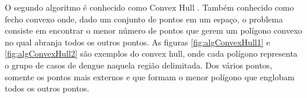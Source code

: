 O segundo algoritmo é conhecido como Convex Hull \cite{ConvexHull}. Também conhecido como fecho convexo onde, dado um conjunto de pontos em um espaço,
o problema consiste em encontrar o menor número de pontos que gerem um polígono convexo no qual abranja todos os outros pontos.
As figuras \ref{fig:algConvexHull1} e \ref{fig:algConvexHull2} são exemplos do convex hull, onde cada polígono representa o grupo de casos de dengue naquela região delimitada. Dos vários pontos, somente os pontos mais externos e que formam o menor polígono que englobam todos os outros pontos.
%
\begin{figure}[h]
	\centering	
\end{figure}
\FloatBarrier
\begin{figure}[h]
	\centering	
\end{figure}
\FloatBarrier

